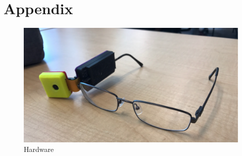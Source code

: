 \chapter{Appendix}

\begin{figure}
	\centering
	\includegraphics[scale = 0.5]{PRAHVI-HARDWARE}
	\caption{Hardware}
	\label{headsetPic}
\end{figure}

